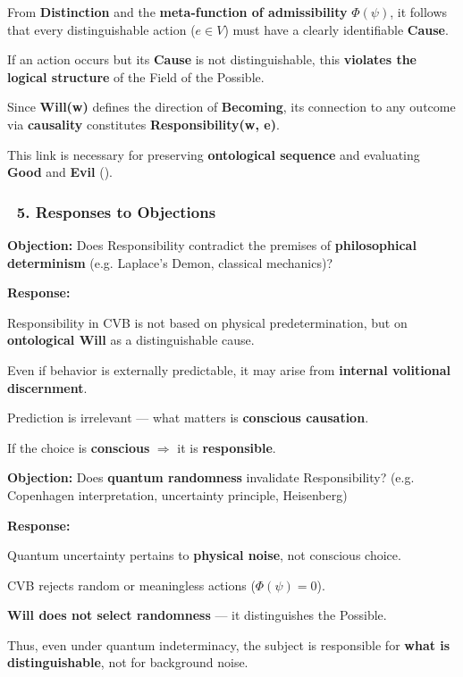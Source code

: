 \documentclass[12pt]{article}
\begin{document}
From \text{[9.1]} \textbf{Distinction} and \text{[11.1.1]} the \textbf{meta-function of admissibility} $\Phi(\psi)$, it follows that every distinguishable action ($e \in V$) must have a clearly identifiable \textbf{Cause}.

If an action occurs but its \textbf{Cause} is not distinguishable, this \textbf{violates the logical structure} of the Field of the Possible.

Since \textbf{Will(w)} defines the direction of \textbf{Becoming}, its connection to any outcome via \textbf{causality} constitutes \textbf{Responsibility(w, e)}.

This link is necessary for preserving \textbf{ontological sequence} and evaluating \textbf{Good} and \textbf{Evil} (\text{[11.3]}).

\subsubsection*{🔹 5. Responses to Objections}

\textbf{Objection:} Does Responsibility contradict the premises of \textbf{philosophical determinism} (e.g. Laplace's Demon, classical mechanics)?

\textbf{Response:}

Responsibility in CVB is not based on physical predetermination, but on \textbf{ontological Will} as a distinguishable cause.

Even if behavior is externally predictable, it may arise from \textbf{internal volitional discernment}.

Prediction is irrelevant — what matters is \textbf{conscious causation}.

If the choice is \textbf{conscious} $\Rightarrow$ it is \textbf{responsible}.

\bigskip

\textbf{Objection:} Does \textbf{quantum randomness} invalidate Responsibility? (e.g. Copenhagen interpretation, uncertainty principle, Heisenberg)

\textbf{Response:}

Quantum uncertainty pertains to \textbf{physical noise}, not conscious choice.

CVB rejects random or meaningless actions ($\Phi(\psi) = 0$).

\textbf{Will does not select randomness} — it distinguishes the Possible.

Thus, even under quantum indeterminacy, the subject is responsible for \textbf{what is distinguishable}, not for background noise.
\end{document}
